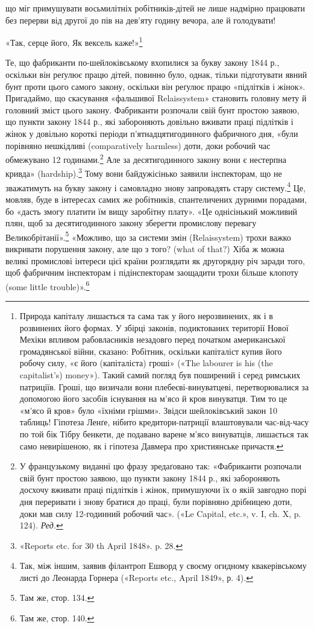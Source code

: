 \parcont{}  %
що міг примушувати восьмилітніх робітників-дітей не лише
надмірно працювати без перерви від другої до пів на дев’яту
годину вечора, але й голодувати!

«Так, серце його,
Як вексель каже!»\footnote{
Природа капіталу лишається та сама так у його нерозвинених, як
і в розвинених його формах. У збірці законів, подиктованих території
Нової Мехіки впливом рабовласників незадовго перед початком американської
громадянської війни, сказано: Робітник, оскільки капіталіст
купив його робочу силу, «є його (капіталіста) гроші» («The labourer
is his (the capitalist's) money»). Такий самий погляд був поширений і серед
римських патриціїв. Гроші, що визичали вони плебеєві-винуватцеві,
перетворювалися за допомогою його засобів існування на м'ясо й кров
винуватця. Тим то це «м’ясо й кров» було «їхніми грішми». Звідси шейлоківський
закон 10 таблиць! Гіпотеза Ленґе, нібито кредитори-патриції
влаштовували час-від-часу по той бік Тібру бенкети, де подавано варене
м’ясо винуватців, лишається так само невирішеною, як і гіпотеза
Давмера про християнське причастя.
}

Те, що фабриканти по-шейлоківському вхопилися за букву
закону 1844 р., оскільки він реґулює працю дітей, повинно було,
однак, тільки підготувати явний бунт проти цього самого закону,
оскільки він реґулює працю «підлітків і жінок». Пригадаймо, що
скасування «фальшивої Relaissystem» становить головну мету
й головний зміст цього закону. Фабриканти розпочали свій бунт
простою заявою, що пункти закону 1844 р., які забороняють довільно
вживати праці підлітків і жінок у довільно короткі
періоди п’ятнадцятигодинного фабричного дня, «були порівняно
нешкідливі (comparatively harmless) доти, доки робочий час
обмежувано 12 годинами.\footnote*{
У французькому виданні цю фразу зредаґовано так: «Фабриканти
розпочали свій бунт простою заявою, що пункти закону 1844 р., які забороняють
досхочу вживати праці підлітків і жінок, примушуючи їх о якій
завгодно порі дня переривати і знову братися до праці, були порівняно
дрібницею доти, доки мав силу 12-годинний робочий час». («Le Capital,
etc.», v. I, ch. X, p. 124). \emph{Ред.}
} Але за десятигодинного закону вони
є нестерпна кривда» (hardship).\footnote{
«Reports etc. for 30 th April 1848». p. 28.
} Тому вони байдужісінько
заявили інспекторам, що не зважатимуть на букву закону і
самовладно знову запровадять стару систему.\footnote{
Так, між іншим, заявив філантроп Ешворд у своєму огидному
квакерівському листі до Леонарда Горнера («Reports etc., April 1849»,
р. 4).
} Це, мовляв,
буде в інтересах самих же робітників, спантеличених дурними
порадами, бо «дасть змогу платити їм вищу заробітну плату».
«Це однісінький можливий плян, щоб за десятигодинного закону
зберегти промислову перевагу Великобрітанії».\footnote{
Там же, стор. 134.
} «Можливо,
що за системи змін (Relaissystem) трохи важко викривати порушення
закону, але що з того? (what of that?) Хіба ж можна
великі промислові інтереси цієї країни розглядати як другорядну
річ заради того, щоб фабричним інспекторам і підінспекторам
заощадити трохи більше клопоту (some little trouble)».\footnote{
Там же, стор. 140.
}
